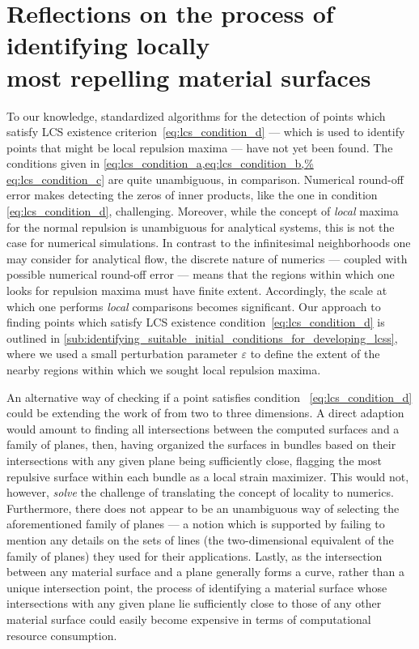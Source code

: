 \section[Reflections on the process of identifying locally most repelling
material surfaces]
{Reflections on the process of identifying locally \\\phantom{5.3} most
repelling material surfaces}
\label{sec:reflections_on_the_process_of_identifying_locally_most_normally%
_repelling_material_surfaces}

To our knowledge, standardized algorithms for the detection of points which
satisfy LCS existence criterion~\eqref{eq:lcs_condition_d} --- which is used to
identify points that might be local repulsion maxima --- have not yet been
found. The conditions given in \cref{eq:lcs_condition_a,eq:lcs_condition_b,%
eq:lcs_condition_c} are quite unambiguous, in comparison. Numerical round-off
error makes detecting the zeros of inner products, like the one in condition~%
\eqref{eq:lcs_condition_d}, challenging. Moreover, while the concept of
\emph{local} maxima for the normal repulsion is unambiguous for analytical
systems, this is not the case for numerical simulations. In contrast to the
infinitesimal neighborhoods one may consider for analytical flow, the discrete
nature of numerics --- coupled with possible numerical round-off error ---
means that the regions within which one looks for repulsion maxima must have
finite extent. Accordingly, the scale at which one performs \emph{local}
comparisons becomes significant. Our approach to finding points which satisfy
LCS existence condition~\eqref{eq:lcs_condition_d} is outlined in
\cref{sub:identifying_suitable_initial_conditions_for_developing_lcss}, where
we used a small perturbation parameter $\varepsilon$ to define the extent of the
nearby regions within which we sought local repulsion maxima.

An alternative way of checking if a point satisfies condition~%
\eqref{eq:lcs_condition_d} could be extending the work of
\textcite{farazmand2012computing} from two to three dimensions. A direct
adaption would amount to finding all intersections between the computed
surfaces and a family of planes, then, having organized the surfaces in bundles
based on their intersections with any given plane being sufficiently close,
flagging the most repulsive surface within each bundle as a local strain
maximizer. This would not, however, \emph{solve} the challenge of translating
the concept of locality to numerics. Furthermore, there does not appear to be
an unambiguous way of selecting the aforementioned family of planes --- a
notion which is supported by \citeauthor{farazmand2012computing} failing to
mention any details on the sets of lines (the two-dimensional equivalent of
the family of planes) they used for their applications. Lastly, as the
intersection between any material surface and a plane generally forms a
curve, rather than a unique intersection point, the process of identifying a
material surface whose intersections with any given plane lie sufficiently
close to those of any other material surface could easily become expensive in
terms of computational resource consumption.

